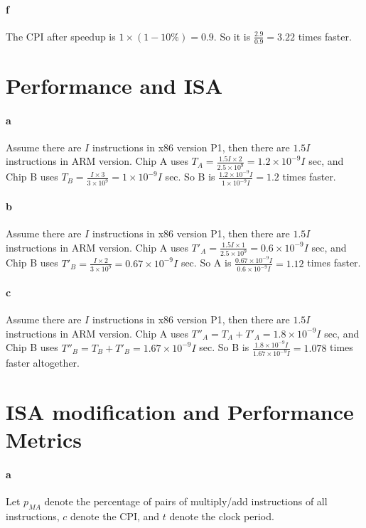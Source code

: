 \documentclass[12pt,letterpaper]{article}
\begin{document}
\paragraph*{f}
The CPI after speedup is $1\times (1-10\%) = 0.9$.
So it is $\frac{2.9}{0.9}=3.22$ times faster.

\section{Performance and ISA}
\paragraph*{a}
Assume there are $I$ instructions in x86 version P1, then there are $1.5I$ 
instructions in ARM version.
Chip A uses $T_A = \frac{1.5I \times 2}{2.5 \times 10^9} = 
1.2\times 10^{-9}I$ sec, and Chip B uses $T_B = \frac{I\times 3}{3\times10^9}
 = 1\times10^{-9}I$
sec. So B is $\frac{1.2\times 10^{-9}I}{1\times10^{-9}I} = 1.2$ times faster.

\paragraph*{b}
Assume there are $I$ instructions in x86 version P1, then there are $1.5I$ 
instructions in ARM version.
Chip A uses $T'_A = \frac{1.5I \times 1}{2.5 \times 10^9} = 
0.6\times 10^{-9}I$ sec, and Chip B uses $T'_B = \frac{I\times 2}{3\times10^9}
 = 0.67\times10^{-9}I$
sec. So A is $\frac{0.67\times 10^{-9}I}{0.6\times10^{-9}I} = 1.12$ times 
faster.

\paragraph*{c}
Assume there are $I$ instructions in x86 version P1, then there are $1.5I$ 
instructions in ARM version.
Chip A uses $T''_A =  T_A + T'_A = 1.8\times 10^{-9}I$ sec, and Chip B uses 
$T''_B = T_B + T'_B  = 1.67\times10^{-9}I$ sec. So B is $\frac{1.8\times 
10^{-9}I}{1.67\times10^{-9}I} = 1.078$ times faster altogether.


\section{ISA modification and Performance Metrics}
\paragraph*{a}
Let $p_{MA}$ denote the percentage of pairs of multiply/add instructions of all
instructions, $c$ denote the CPI, and $t$ denote the clock period.
\end{document}
